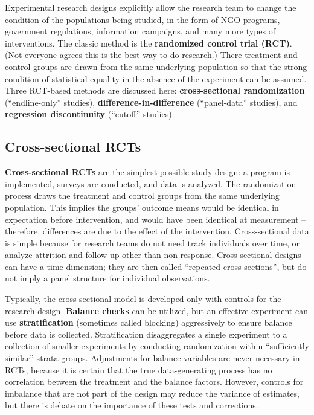 Experimental research designs explicitly allow the research team
to change the condition of the populations being studied,
in the form of NGO programs, government regulations,
information campaigns, and many more types of interventions.\cite{banerjee2009experimental}
The classic method is the \textbf{randomized control trial (RCT)}.
(Not everyone agrees this is the best way to do research.)
There treatment and control groups are drawn from the same underlying population
so that the strong condition of statistical equality
in the absence of the experiment can be assumed.
Three RCT-based methods are discussed here:
\textbf{cross-sectional randomization} (``endline-only'' studies),
\textbf{difference-in-difference} (``panel-data'' studies),
and \textbf{regression discontinuity} (``cutoff'' studies).

\subsection{Cross-sectional RCTs}

\textbf{Cross-sectional RCTs} are the simplest possible study design:
a program is implemented, surveys are conducted, and data is analyzed.
The randomization process
draws the treatment and control groups from the same underlying population.
This implies the groups' outcome means would be identical in expectation
before intervention, and would have been identical at measurement --
therefore, differences are due to the effect of the intervention.
Cross-sectional data is simple because
for research teams do not need track individuals over time,
or analyze attrition and follow-up other than non-response.
Cross-sectional designs can have a time dimension;
they are then called ``repeated cross-sections'',
but do not imply a panel structure for individual observations.

Typically, the cross-sectional model is developed
only with controls for the research design.
\textbf{Balance checks} can be utilized, but an effective experiment
can use \textbf{stratification} (sometimes called blocking) aggressively to ensure balance
before data is collected.\cite{athey2017econometrics}
Stratification disaggregates a single experiment to a collection
of smaller experiments by conducting randomization within
``sufficiently similar'' strata groups.
Adjustments for balance variables are never necessary in RCTs,
because it is certain that the true data-generating process
has no correlation between the treatment and the balance factors.
However, controls for imbalance that are not part of the design
may reduce the variance of estimates, but there is debate on
the importance of these tests and corrections.

